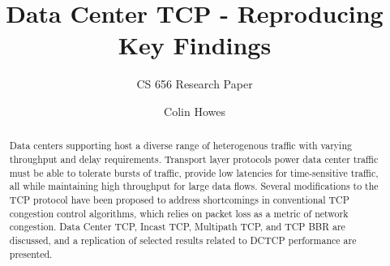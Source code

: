 \documentclass[sigconf]{acmart}
\begin{document}
\title{Data Center TCP - Reproducing Key Findings}
\subtitle{CS 656 Research Paper}


\author{Colin Howes}

\begin{abstract}

Data centers supporting host a diverse range of heterogenous traffic with varying throughput and delay requirements. Transport layer protocols power data center traffic must be able to tolerate bursts of traffic, provide low latencies for time-sensitive traffic, all while maintaining high throughput for large data flows. Several modifications to the TCP protocol have been proposed to address shortcomings in conventional TCP congestion control algorithms, which relies on packet loss as a metric of network congestion. Data Center TCP, Incast TCP, Multipath TCP, and TCP BBR are discussed, and a replication of selected results related to DCTCP performance are presented.

\end{abstract}

\maketitle




 
\end{document}
